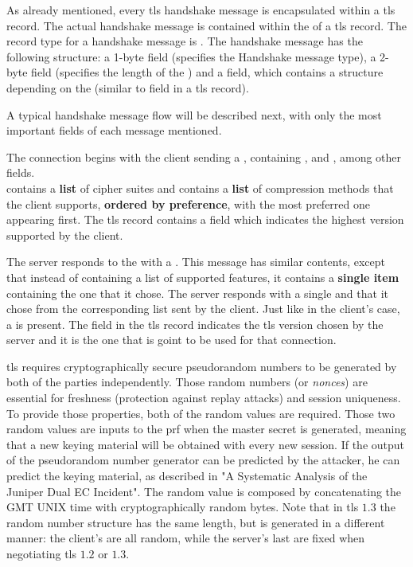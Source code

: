\documentclass{llncs}
\begin{document}
{As already mentioned, every \gls{tls} handshake message is encapsulated within
a \gls{tls} record. The actual handshake message is contained within the
 of a \gls{tls} record. The record type for a handshake
message is . The handshake message has the following structure:
a 1-byte  field (specifies the Handshake message type),
a 2-byte  field (specifies the length of the )
and a  field, which contains a structure depending on the
 (similar to  field in a \gls{tls} record).

A typical handshake message flow will be described next, with only the most important fields of each message mentioned.

The connection begins with the client sending a , containing ,  and ,
among other fields.
\\ contains a \textbf{list} of cipher suites and 
contains a \textbf{list} of compression methods that the
client supports, \textbf{ordered by preference}, with the most preferred one appearing first.
The \gls{tls} record contains a   field which
indicates the highest version supported by the client.

The server responds to the  with a .
This message has similar contents, except that instead of containing
a list of supported features, it contains a \textbf{single item} containing the one that it chose. The server responds with a single  and
 that it chose from the
corresponding list sent by the client. Just like in the client's case, a 
is present. The  field in the \gls{tls} record indicates
the \gls{tls} version chosen by the server and it is the one that is goint to be
used for that connection.

\gls{tls} requires cryptographically secure pseudorandom numbers to be generated
by both of the parties independently. Those random numbers (or \textit{nonces}) are essential for freshness
(protection against replay attacks) and session uniqueness. To provide those
properties, both of the random values are required. Those two random values are inputs to the \gls{prf} when the master secret is generated, meaning
that a new keying material will be obtained with every new session. If the output of the pseudorandom number generator
can be predicted by the attacker, he can predict the keying material, as described
in "A Systematic Analysis of the Juniper Dual EC Incident"\cite{DualECJu15:online}.
The  random value is composed by concatenating the 
GMT UNIX time with  cryptographically random bytes. Note that in \gls{tls} $1.3$
the random number structure has the same length, but is generated in a different manner:
the client's  are all random, while the server's last 
are fixed when negotiating \gls{tls} $1.2$ or $1.3$.

}
\end{document}
